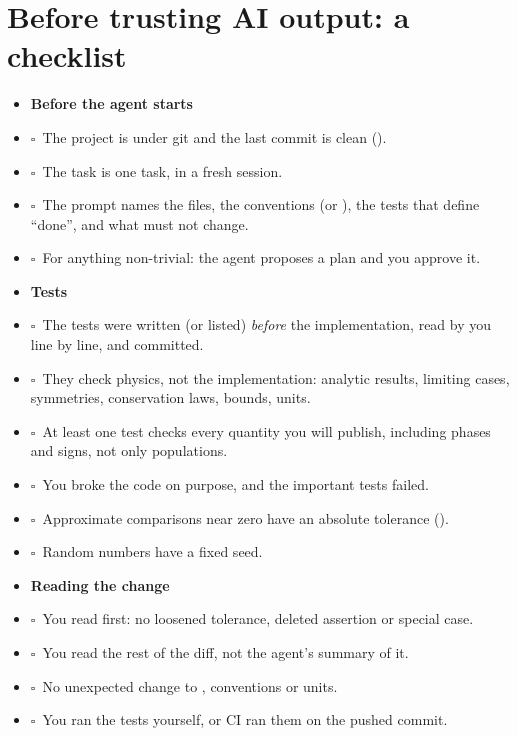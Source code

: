 \clearpage
\section{Before trusting AI output: a checklist}\label{sec:checklist}

\newcommand{\cb}{$\square$\ }
\begin{itemize}[label={}, leftmargin=0pt, itemsep=0pt, parsep=0pt]
\item \textbf{Before the agent starts}
\item \cb The project is under git and the last commit is clean ().
\item \cb The task is one task, in a fresh session.
\item \cb The prompt names the files, the conventions (or ), the tests that
      define ``done'', and what must not change.
\item \cb For anything non-trivial: the agent proposes a plan and you approve it.

\smallskip
\item \textbf{Tests}
\item \cb The tests were written (or listed) \emph{before} the implementation, read by
      you line by line, and committed.
\item \cb They check physics, not the implementation: analytic results, limiting cases,
      symmetries, conservation laws, bounds, units.
\item \cb At least one test checks every quantity you will publish, including phases and
      signs, not only populations.
\item \cb You broke the code on purpose, and the important tests failed.
\item \cb Approximate comparisons near zero have an absolute tolerance ().
\item \cb Random numbers have a fixed seed.

\smallskip
\item \textbf{Reading the change}
\item \cb You read  first: no loosened tolerance, deleted assertion
      or special case.
\item \cb You read the rest of the diff, not the agent's summary of it.
\item \cb No unexpected change to , conventions or units.
\item \cb You ran the tests yourself, or CI ran them on the pushed commit.


\end{itemize}
